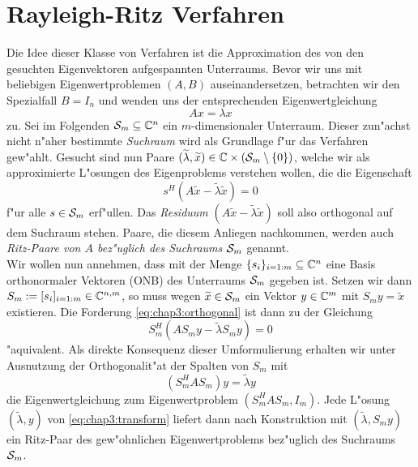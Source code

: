 \section{Rayleigh-Ritz Verfahren}\label{sec:chap3:rayleighRitz}
Die Idee dieser Klasse von Verfahren ist die Approximation des von
den gesuchten Eigenvektoren aufgespannten Unterraums.
Bevor wir uns mit beliebigen Eigenwertproblemen $(A,B)$ auseinandersetzen, betrachten wir den Spezialfall $B=I_n$ und wenden uns der entsprechenden Eigenwertgleichung
\[
Ax = \lambda x
\]
zu. Sei im Folgenden $\S_m\subseteq\Cn$ ein $m$-dimensionaler Unterraum. Dieser zun"achst nicht
n"aher bestimmte \emph{Suchraum} wird als Grundlage f"ur das Verfahren gew"ahlt.
Gesucht sind nun Paare $(\widetilde{\lambda}, \widetilde{x})\in\C\times (\S_m \setminus\{0\})$,
welche wir als approximierte L"osungen des Eigenproblems verstehen wollen, die
die Eigenschaft
\begin{equation}\label{eq:chap3:orthogonal}
s^H(A\widetilde{x} - \widetilde{\lambda}\widetilde{x})=0
\end{equation}
f"ur alle $s \in \S_m $ erf"ullen. Das \emph{Residuum} $(A\widetilde{x} - \widetilde{\lambda}\widetilde{x})$
soll also orthogonal auf dem Suchraum stehen. Paare, die diesem Anliegen nachkommen,
werden auch \emph{Ritz-Paare von $A$ bez"uglich des Suchraums $\S_m$} genannt.\\

Wir wollen nun annehmen, dass mit der Menge $\{s_i\}_{i=1:m}\subseteq \Cn$ eine Basis orthonormaler Vektoren (ONB) des Unterraums $\S_m$ gegeben ist. Setzen wir dann $S_m :=[s_i]_{i=1:m}\in\C^{n,m}$, so muss wegen $\widetilde{x}\in\S_m$
ein Vektor $y\in\C^m$ mit $S_m y = \widetilde{x}$ existieren. Die Forderung \eqref{eq:chap3:orthogonal}
ist dann zu der Gleichung
\[
S_m^H(AS_m y - \widetilde{\lambda} S_m y) = 0
\]
"aquivalent. Als direkte Konsequenz dieser Umformulierung erhalten wir unter Ausnutzung
der Orthogonalit"at der Spalten von $S_m$ mit
\begin{equation}\label{eq:chap3:transform}
(S_m^H A S_m) y = \widetilde{\lambda}y
\end{equation}
die Eigenwertgleichung zum Eigenwertproblem $(S_m^H A S_m, I_m)$. Jede L"osung $(\widetilde{\lambda},y)$ von \eqref{eq:chap3:transform}
liefert dann nach Konstruktion mit $(\widetilde{\lambda}, S_m y)$ ein Ritz-Paar des gew"ohnlichen
Eigenwertproblems bez"uglich des Suchraums $\S_m$.\\

